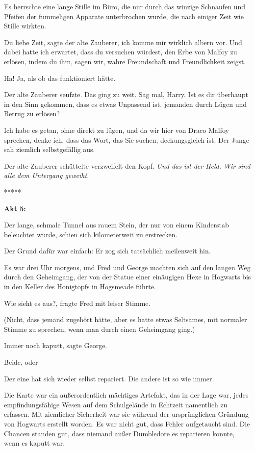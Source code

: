 Es herrschte eine lange Stille im Büro, die nur durch das winzige Schnaufen und
Pfeifen der fummeligen Apparate unterbrochen wurde, die nach einiger Zeit wie
Stille wirkten.

\glqq{}Du liebe Zeit\grqq{}, sagte der alte Zauberer, \glqq{}ich komme mir
wirklich albern vor. Und dabei hatte ich erwartet, dass du versuchen würdest,
den Erbe von Malfoy zu erlösen, indem du ihm, sagen wir, wahre Freundschaft und
Freundlichkeit zeigst.\grqq{}

\glqq{}Ha! Ja, als ob das funktioniert hätte.\grqq{}

Der alte Zauberer seufzte. Das ging zu weit. \glqq{}Sag mal, Harry. Ist es dir
überhaupt in den Sinn gekommen, dass es etwas Unpassend ist, jemanden durch
Lügen und Betrug zu erlösen?\grqq{}

\glqq{}Ich habe es getan, ohne direkt zu lügen, und da wir hier von Draco Malfoy
sprechen, denke ich, dass das Wort, das Sie suchen, deckungsgleich ist.\grqq{}
Der Junge sah ziemlich selbstgefällig aus.

Der alte Zauberer schüttelte verzweifelt den Kopf. \glqq{}\emph{Und das ist der
Held. Wir sind alle dem Untergang geweiht.}\grqq{}

\begin{center}*****\end{center}

\textbf{Akt 5:}

Der lange, schmale Tunnel aus rauem Stein, der nur von einem Kinderstab
beleuchtet wurde, schien sich kilometerweit zu erstrecken.

Der Grund dafür war einfach: Er zog sich tatsächlich meilenweit hin.

Es war drei Uhr morgens, und Fred und George machten sich auf den langen Weg
durch den Geheimgang, der von der Statue einer einäugigen Hexe in Hogwarts bis
in den Keller des Honigtopfs in Hogsmeade führte.

\glqq{}Wie sieht es aus?\grqq{}, fragte Fred mit leiser Stimme.

(Nicht, dass jemand zugehört hätte, aber es hatte etwas Seltsames, mit normaler
Stimme zu sprechen, wenn man durch einen Geheimgang ging.)

\glqq{}Immer noch kaputt\grqq{}, sagte George.

\glqq{}Beide, oder -\grqq{}

\glqq{}Der eine hat sich wieder selbst repariert. Die andere ist so wie
immer.\grqq{}

Die Karte war ein außerordentlich mächtiges Artefakt, das in der Lage war, jedes
empfindungsfähige Wesen auf dem Schulgelände in Echtzeit namentlich zu erfassen.
Mit ziemlicher Sicherheit war sie während der ursprünglichen Gründung von
Hogwarts erstellt worden. Es war nicht gut, dass Fehler aufgetaucht sind. Die
Chancen standen gut, dass niemand außer Dumbledore es reparieren konnte, wenn es
kaputt war.

